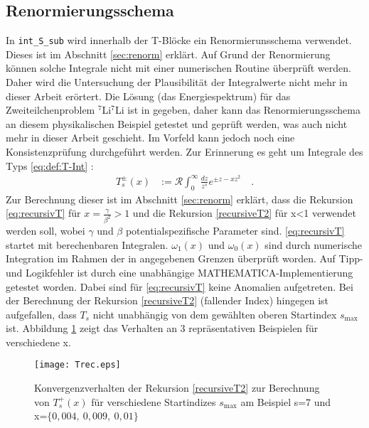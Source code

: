 \subsection{Renormierungsschema}
%
In \texttt{int\_S\_sub} wird innerhalb der T-Blöcke ein Renormierunsschema 
verwendet. Dieses ist im Abschnitt \ref{sec:renorm} erklärt. Auf Grund der 
Renormierung können solche Integrale nicht mit einer numerischen Routine 
überprüft werden. Daher wird die Untersuchung der Plausibilität der 
Integralwerte nicht mehr in dieser Arbeit erörtert. Die Lösung (das 
Energiespektrum) für das 
Zweiteilchenproblem $^7$Li$^7$Li ist in \cite{phdthesis:sergey} gegeben, 
daher kann das Renormierungsschema an diesem physikalischen Beispiel getestet 
und geprüft werden, was auch nicht mehr in dieser Arbeit geschieht. Im Vorfeld 
kann jedoch noch eine Konsistenzprüfung durchgeführt werden. Zur Erinnerung es 
geht um Integrale des Typs \ref{eq:def:T-Int} :
%
\begin{align*}
T_s^\pm(x)&:=\mathcal{R}\int_{0}^{\infty}\frac{dz}{z^s}e^{\pm z-xz^2} \quad.
\end{align*}
%
Zur Berechnung dieser ist im Abschnitt \ref{sec:renorm} erklärt, dass die 
Rekursion \ref{eq:recursivT} für $x=\frac{\gamma}{\beta^2}>1$ und die Rekursion 
\ref{recursiveT2} für x<1 verwendet werden soll, wobei $\gamma$ und 
$\beta$ potentialspezifische Parameter sind.  \ref{eq:recursivT} 
 startet mit berechenbaren Integralen. $\omega_1(x)$ und $\omega_0(x)$ sind 
 durch numerische Integration im Rahmen der in \cite{av:1a2} angegebenen 
 Grenzen überprüft worden. Auf Tipp- und Logikfehler ist durch eine unabhängige 
 MATHEMATICA-Implementierung getestet worden. Dabei sind für \ref{eq:recursivT} 
 keine Anomalien aufgetreten. Bei der Berechnung der Rekursion 
 \ref{recursiveT2} (fallender Index) hingegen ist aufgefallen, dass $T_s$ nicht 
 unabhängig von dem gewählten oberen Startindex $s_\text{max}$ ist. Abbildung 
 \ref{pic:Trec} zeigt das Verhalten an 3 repräsentativen Beispielen für 
 verschiedene x.    
%
\begin{figure}[t] \centering
	\texttt{[image: Trec.eps]}
	\caption{Konvergenzverhalten der Rekursion \ref{recursiveT2} zur Berechnung 
	von $T^+_s(x)$ für 
	verschiedene Startindizes $s_\text{max}$ am Beispiel s=7 und x=$\{0,004 ,\ 
	0,009 ,\ 0,01 \}$ }
	\label{pic:Trec} 
\end{figure}
%

